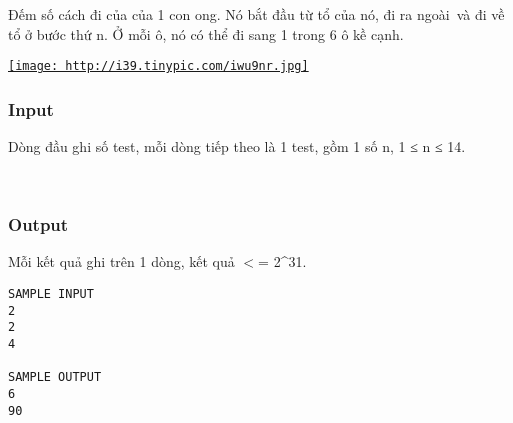 

Đếm số cách đi của của 1 con ong. Nó bắt đầu từ tổ của nó, đi ra ngoài và đi về tổ ở bước thứ n. Ở mỗi ô, nó có thể đi sang 1 trong 6 ô kề cạnh.

\href{http://tinypic.com}{
\texttt{[image: http://i39.tinypic.com/iwu9nr.jpg]}}

\subsubsection{Input}

Dòng đầu ghi số test, mỗi dòng tiếp theo là 1 test, gồm 1 số n, 1 ≤ n ≤ 14.

 

\subsubsection{Output}

Mỗi kết quả ghi trên 1 dòng, kết quả $<$= 2\textasciicircum31.
\begin{verbatim}
SAMPLE INPUT
2
2
4

SAMPLE OUTPUT
6
90
\end{verbatim}